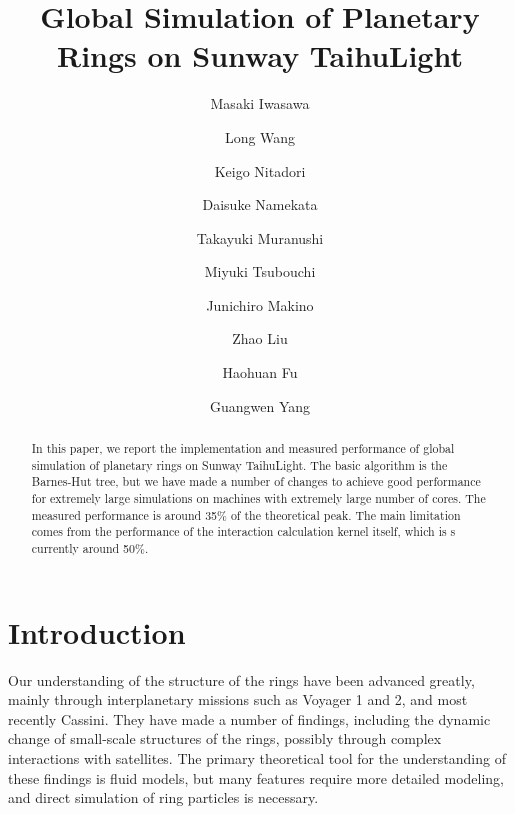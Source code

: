 \documentclass[oribibl]{llncs}
\begin{document}
\title{Global Simulation of Planetary Rings on Sunway TaihuLight}

\author{Masaki Iwasawa  \and Long Wang  \and Keigo
  Nitadori  \and Daisuke Namekata  \and Takayuki
  Muranushi  \and Miyuki Tsubouchi  \and Junichiro
  Makino  \and Zhao Liu  \and Haohuan Fu
   \and Guangwen Yang }


\maketitle

\begin{abstract}

  In this paper, we report the implementation and measured performance
  of global simulation of planetary rings on Sunway TaihuLight.  The
  basic algorithm is the Barnes-Hut tree, but we have made a number of
  changes to achieve good performance for extremely large simulations
  on machines with extremely large number of cores.  The measured
  performance is around 35\% of the theoretical peak. The main
  limitation comes from the performance of the interaction calculation
  kernel itself, which is s currently around 50\%.

\end{abstract}

\section{Introduction}
\label{sect:intro}

Our understanding of the structure of the rings have been advanced
greatly, mainly through interplanetary missions such as Voyager 1 and
2, and most recently Cassini. They have made a number of findings,
including the dynamic change of small-scale structures of the rings,
possibly through complex interactions with satellites. The primary
theoretical tool for the understanding of these findings is fluid
models, but many features require more detailed modeling, and direct
simulation of ring particles is necessary.
\end{document}

